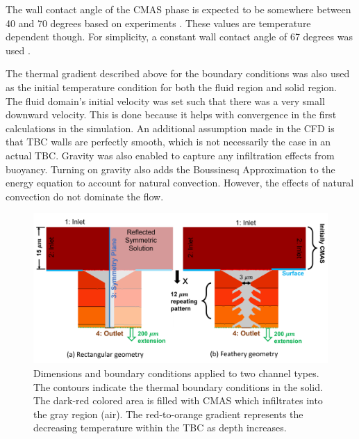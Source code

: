 \documentclass[%
 aip,
 amsmath,amssymb,
 reprint,%
floatfix]{revtex4-1}
\begin{document}
The wall contact angle of the CMAS phase is expected to be somewhere between 40 and 70 degrees based on experiments \cite{Naraparaju2019}. 
These values are temperature dependent though. For simplicity, a constant wall contact angle of 67 degrees was used \cite{Naraparaju2019}.

The thermal gradient described above for the boundary conditions was also used as the initial temperature condition for both the fluid region and solid region. The fluid domain's initial velocity was set such that there was a very small downward velocity. This is done because it helps with convergence in the first calculations in the simulation.  An additional assumption made in the CFD is that TBC walls are perfectly smooth, which is not necessarily the case in an actual TBC.  Gravity was also enabled to capture any infiltration effects from buoyancy. Turning on gravity also adds the Boussinesq Approximation to the energy equation to account for natural convection. However, the effects of natural convection do not dominate the flow. 


\begin{figure}
    \centering
    \includegraphics[width=0.9\linewidth]{Figures/dimensionsTwoView.png}
    \caption{Dimensions and boundary conditions applied to two channel types. The contours indicate the thermal boundary conditions in the solid. The dark-red colored area is filled with CMAS which infiltrates into the gray region (air). The red-to-orange gradient represents the decreasing temperature within the TBC as depth increases.}
    \label{fig:dimensions}
\end{figure}
\end{document}
